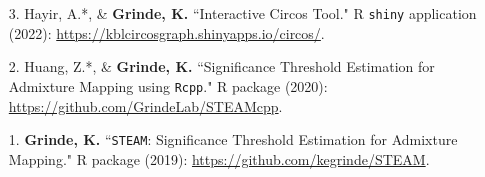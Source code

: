 \documentclass[margin]{res}
\begin{document}
\begin{resume}
\begin{itemize}
\item[3.] Hayir, A.*, \& \textbf{Grinde, K.} ``Interactive Circos Tool." R \texttt{shiny} application (2022): \href{https://kblcircosgraph.shinyapps.io/circos/}{https://kblcircosgraph.shinyapps.io/circos/}.

\item[2.] Huang, Z.*, \& \textbf{Grinde, K.} ``Significance Threshold Estimation for Admixture Mapping using \texttt{Rcpp}." R package (2020): \href{https://github.com/GrindeLab/STEAMcpp}{https://github.com/GrindeLab/STEAMcpp}.

\item[1.] \textbf{Grinde, K.} ``\texttt{STEAM}: Significance Threshold Estimation for Admixture Mapping." R package (2019): \href{https://github.com/kegrinde/STEAM}{https://github.com/kegrinde/STEAM}.\\
	
\end{itemize}






    
 

\end{resume}
\end{document}
